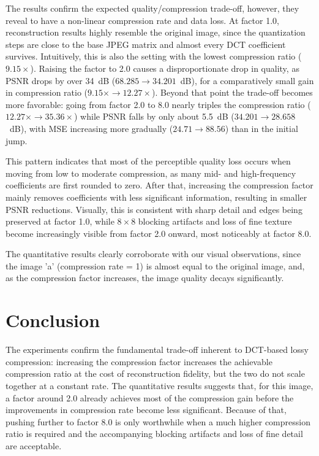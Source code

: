 \documentclass[11pt,a4paper]{article}
\begin{document}
The results confirm the expected quality/compression trade-off, however, they reveal to have a non-linear compression rate and data loss. At factor 1.0, reconstruction results highly resemble the original image, since the quantization steps are close to the base JPEG matrix and almost every DCT coefficient survives. Intuitively, this is also the setting with the lowest compression ratio ($9.15\times$). Raising the factor to 2.0 causes a disproportionate drop in quality, as PSNR drops by over 34~dB ($68.285 \rightarrow 34.201$~dB), for a comparatively small gain in compression ratio ($9.15\times \rightarrow 12.27\times$). Beyond that point the trade-off becomes more favorable: going from factor 2.0 to 8.0 nearly triples the compression ratio ($12.27\times \rightarrow 35.36\times$) while PSNR falls by only about 5.5~dB ($34.201 \rightarrow 28.658$~dB), with MSE increasing more gradually ($24.71 \rightarrow 88.56$) than in the initial jump.
 
This pattern indicates that most of the perceptible quality loss occurs when moving from low to moderate compression, as many mid- and high-frequency coefficients are first rounded to zero. After that, increasing the compression factor mainly removes coefficients with less significant information, resulting in smaller PSNR reductions. Visually, this is consistent with sharp detail and edges being preserved at factor 1.0, while $8\times8$ blocking artifacts and loss of fine texture become increasingly visible from factor 2.0 onward, most noticeably at factor 8.0. 

The quantitative results clearly corroborate with our visual observations, since the image 'a' (compression rate = 1) is almost equal to the original image, and, as the compression factor increases, the image quality decays significantly.

\section{Conclusion}
The experiments confirm the fundamental trade-off inherent to DCT-based lossy compression: increasing the compression factor increases the achievable compression ratio at the cost of reconstruction fidelity, but the two do not scale together at a constant rate. The quantitative results suggests that, for this image, a factor around 2.0 already achieves most of the compression gain before the improvements in compression rate become less significant. Because of that, pushing further to factor 8.0 is only worthwhile when a much higher compression ratio is required and the accompanying blocking artifacts and loss of fine detail are acceptable.
\end{document}
